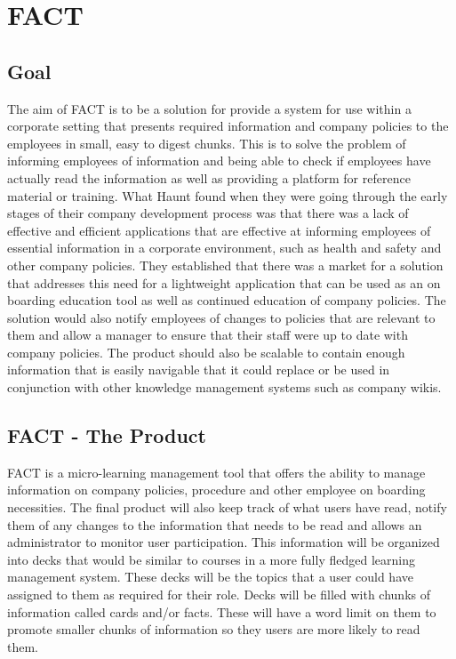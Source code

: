 
\chapter{FACT}

\section{Goal}
The aim of FACT is to be a solution for provide a system for use within a corporate setting that presents required information and company policies to the employees in small, easy to digest chunks. This is to solve the problem of informing employees of information and being able to check if employees have actually read the information as well as providing a platform for reference material or training. What Haunt found when they were going through the early stages of their company development process was that there was a lack of effective and efficient applications that are effective at informing employees of essential information in a corporate environment, such as health and safety and other company policies. They established that there was a market for a solution that addresses this need for a lightweight application that can be used as an on boarding education tool as well as continued education of company policies. The solution would also notify employees of changes to policies that are relevant to them and allow a manager to ensure that their staff were up to date with company policies. The product should also be scalable to contain enough information that is easily navigable that it could replace or be used in conjunction with other knowledge management systems such as company wikis.

\section{FACT - The Product}
FACT is a micro-learning management tool that offers the ability to manage information on company policies, procedure and other employee on boarding necessities. The final product will also keep track of what users have read, notify them of any changes to the information that needs to be read and allows an administrator to monitor user participation. This information will be organized into decks that would be similar to courses in a more fully fledged learning management system. These decks will be the topics that a user could have assigned to them as required for their role. Decks will be filled with chunks of information called cards and/or facts. These will have a word limit on them to promote smaller chunks of information so they users are more likely to read them.

